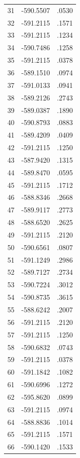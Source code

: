 \documentclass[a4paper,12pt]{article}
\begin{document}
\begin{table}[h]
\begin{tabular}{|c|c|c|}
        31 & -590.5507 & .0530 \\
        32 & -591.2115 & .1571 \\
        33 & -591.2115 & .1234 \\
        34 & -590.7486 & .1258 \\
        35 & -591.2115 & .0378 \\
        36 & -589.1510 & .0974 \\
        37 & -591.0133 & .0941 \\
        38 & -589.2126 & .2743 \\
        39 & -589.0387 & .1890 \\
        40 & -590.8793 & .0883 \\
        41 & -589.4209 & .0409 \\
        42 & -591.2115 & .1250 \\
        43 & -587.9420 & .1315 \\
        44 & -589.8470 & .0595 \\
        45 & -591.2115 & .1712 \\
        46 & -588.8346 & .2668 \\
        47 & -589.9117 & .2773 \\
        48 & -588.6520 & .2625 \\
        49 & -591.2115 & .2120 \\
        50 & -590.6561 & .0807 \\
        51 & -591.1249 & .2986 \\
        52 & -589.7127 & .2734 \\
        53 & -590.7224 & .3012 \\
        54 & -590.8735 & .3615 \\
        55 & -588.6242 & .2007 \\
        56 & -591.2115 & .2120 \\
        57 & -591.2115 & .1250 \\
        58 & -590.6832 & .0743 \\
        59 & -591.2115 & .0378 \\
        60 & -591.1842 & .1082 \\
        61 & -590.6996 & .1272 \\
        62 & -595.8620 & .0899  \\
        63 & -591.2115 & .0974 \\
        64 & -588.8836 & .1014 \\
        65 & -591.2115 & .1571 \\
        66 & -590.1420 & .1533 \\

\end{tabular}
\end{table}
\end{document}
